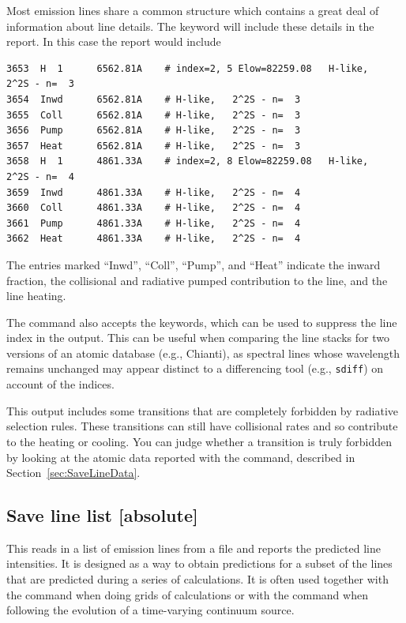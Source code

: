 Most emission lines share a common structure which contains a
great deal of information about line details.  The keyword  
will include these details in the report.  In this case
the report would include
\begin{verbatim}
3653  H  1      6562.81A    # index=2, 5 Elow=82259.08   H-like,   2^2S - n=  3
3654  Inwd      6562.81A    # H-like,   2^2S - n=  3
3655  Coll      6562.81A    # H-like,   2^2S - n=  3
3656  Pump      6562.81A    # H-like,   2^2S - n=  3
3657  Heat      6562.81A    # H-like,   2^2S - n=  3
3658  H  1      4861.33A    # index=2, 8 Elow=82259.08   H-like,   2^2S - n=  4
3659  Inwd      4861.33A    # H-like,   2^2S - n=  4
3660  Coll      4861.33A    # H-like,   2^2S - n=  4
3661  Pump      4861.33A    # H-like,   2^2S - n=  4
3662  Heat      4861.33A    # H-like,   2^2S - n=  4
\end{verbatim}
The entries marked ``Inwd'', ``Coll'', ``Pump'', and ``Heat'' indicate
the inward fraction, the collisional and radiative pumped contribution to
the line, and the line heating.  

The command also accepts the  keywords,
which can be used to suppress the line index in the output.
This can be useful when comparing the line stacks for two versions of an
atomic database (e.g., Chianti), as spectral lines whose wavelength remains
unchanged may appear distinct to a differencing tool (e.g., \texttt{sdiff})
on account of the indices.

This output includes some transitions that are completely forbidden by
radiative selection rules.  These transitions can still have collisional
rates and so contribute to the heating or cooling.  You can judge
whether a transition is truly forbidden by looking at the atomic data
reported with the  command, described in
Section~\ref{sec:SaveLineData}.

\subsection{Save line list [absolute]}

This reads in a list of emission lines from a file and reports the
predicted line intensities.  It is designed as a way to obtain predictions
for a subset of the lines that are predicted during a series of calculations.
It is often used together with the  command
when doing grids of calculations or with the  command
when following the evolution of a time-varying
continuum source.

